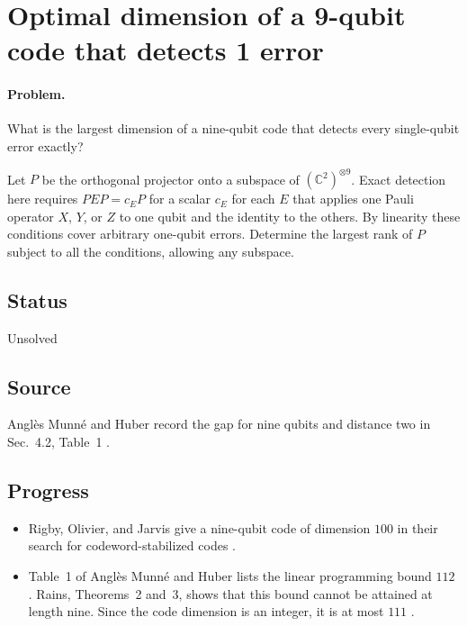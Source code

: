 \section{Optimal dimension of a 9-qubit code that detects 1 error}
\label{sec:op_0af3e22238a42d74}

\paragraph{Problem.}
What is the largest dimension of a nine-qubit code that detects every single-qubit error exactly?

Let $P$ be the orthogonal projector onto a subspace of $(\mathbb C^2)^{\otimes9}$. Exact detection here requires $PEP=c_E P$ for a scalar $c_E$ for each $E$ that applies one Pauli operator $X$, $Y$, or $Z$ to one qubit and the identity to the others. By linearity these conditions cover arbitrary one-qubit errors. Determine the largest rank of $P$ subject to all the conditions, allowing any subspace.

\subsection*{Status}

Unsolved

\subsection*{Source}

Anglès Munné and Huber record the gap for nine qubits and distance two in Sec.~4.2, Table~1 .

\subsection*{Progress}

\begin{itemize}
  \item Rigby, Olivier, and Jarvis give a nine-qubit code of dimension $100$ in their search for codeword-stabilized codes .

  \item Table~1 of Anglès Munné and Huber lists the linear programming bound $112$ . Rains, Theorems~2 and~3, shows that this bound cannot be attained at length nine. Since the code dimension is an integer, it is at most $111$ .
\end{itemize}

